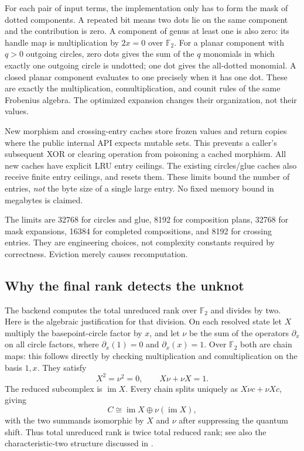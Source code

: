 \documentclass[11pt]{article}
\theoremstyle{remark}\newtheorem{remark}[theorem]{Remark}
\newcommand{\F}{\mathbb F}
\newcommand{\code}[1]{\texttt{\detokenize{#1}}}
\begin{document}
For each pair of input terms, the implementation only has to form the mask of
dotted components. A repeated bit means two dots lie on the same component and
the contribution is zero. A component of genus at least one is also zero:
its handle map is multiplication by $2x=0$ over $\F_2$. For a planar component
with $q>0$ outgoing circles, zero dots gives the sum of the $q$ monomials in
which exactly one outgoing circle is undotted; one dot gives the all-dotted
monomial. A closed planar component evaluates to one precisely when it has
one dot. These are exactly the multiplication, comultiplication, and counit
rules of the same Frobenius algebra. The optimized expansion changes their
organization, not their values.

New morphism and crossing-entry caches store frozen values and return copies
where the public internal API expects mutable sets. This prevents a caller's
subsequent XOR or clearing operation from poisoning a cached morphism. All
new caches have explicit LRU entry ceilings. The existing circles/glue caches
also receive finite entry ceilings, and \code{clear_caches()} resets them.
These limits bound the number of entries, \emph{not} the byte size of a single
large entry. No fixed memory bound in megabytes is claimed.

The limits are 32768 for circles and glue, 8192 for composition plans, 32768
for mask expansions, 16384 for completed compositions, and 8192 for crossing
entries. They are engineering choices, not complexity constants required by
correctness. Eviction merely causes recomputation.

\subsection{Why the final rank detects the unknot}
\label{sec:detection}
The backend computes the total unreduced rank over $\F_2$ and divides by two.
Here is the algebraic justification for that division. On each resolved state
let $X$ multiply the basepoint-circle factor by $x$, and let $\nu$ be the sum
of the operators $\partial_x$ on all circle factors, where
$\partial_x(1)=0$ and $\partial_x(x)=1$. Over $\F_2$ both are chain maps:
this follows directly by checking multiplication and comultiplication on the
basis $1,x$. They satisfy
\[
 X^2=\nu^2=0,\qquad X\nu+\nu X=1.
\]
The reduced subcomplex is $\operatorname{im}X$. Every chain splits uniquely as
$X\nu c+\nu Xc$, giving
\[
 C\cong\operatorname{im}X\oplus\nu(\operatorname{im}X),
\]
with the two summands isomorphic by $X$ and $\nu$ after suppressing the quantum
shift. Thus total unreduced rank is twice total reduced rank; see also the
characteristic-two structure discussed in \cite{Shumakovitch}.
\end{document}
